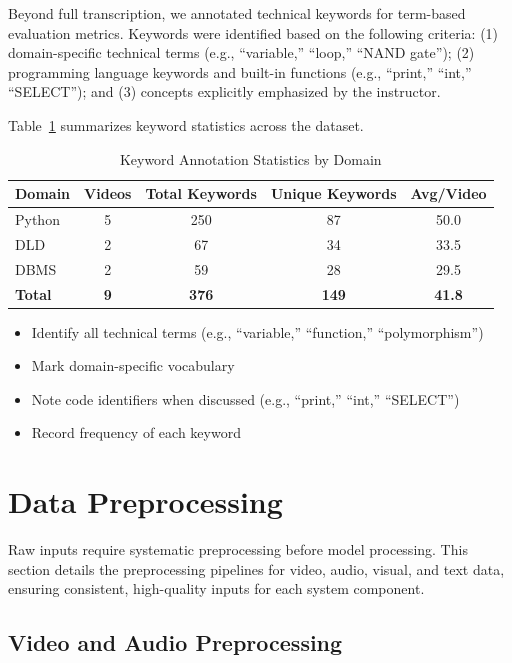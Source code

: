 Beyond full transcription, we annotated technical keywords for term-based evaluation metrics. Keywords were identified based on the following criteria: (1) domain-specific technical terms (e.g., ``variable,'' ``loop,'' ``NAND gate''); (2) programming language keywords and built-in functions (e.g., ``print,'' ``int,'' ``SELECT''); and (3) concepts explicitly emphasized by the instructor.

Table~\ref{tab:keyword_stats} summarizes keyword statistics across the dataset.

\begin{table}[h]
\centering
\caption{Keyword Annotation Statistics by Domain}
\label{tab:keyword_stats}
\begin{tabular}{|l|c|c|c|c|}
\hline
\textbf{Domain} & \textbf{Videos} & \textbf{Total Keywords} & \textbf{Unique Keywords} & \textbf{Avg/Video} \\
\hline
Python & 5 & 250 & 87 & 50.0 \\
\hline
DLD & 2 & 67 & 34 & 33.5 \\
\hline
DBMS & 2 & 59 & 28 & 29.5 \\
\hline
\textbf{Total} & \textbf{9} & \textbf{376} & \textbf{149} & \textbf{41.8} \\
\hline
\end{tabular}
\end{table}

\begin{itemize}
    \item Identify all technical terms (e.g., ``variable,'' ``function,'' ``polymorphism'')
    \item Mark domain-specific vocabulary
    \item Note code identifiers when discussed (e.g., ``print,'' ``int,'' ``SELECT'')
    \item Record frequency of each keyword
\end{itemize}

\section{Data Preprocessing}

Raw inputs require systematic preprocessing before model processing. This section details the preprocessing pipelines for video, audio, visual, and text data, ensuring consistent, high-quality inputs for each system component.

\subsection{Video and Audio Preprocessing}

